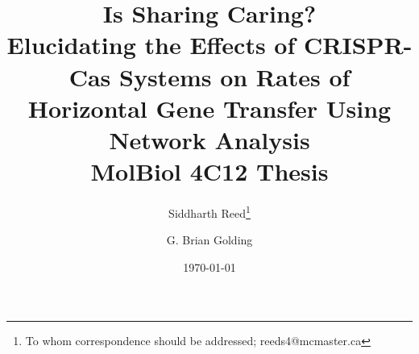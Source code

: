 \documentclass[12pt,letter]{article}
\begin{document}
\title{{\fontsize{30}{50}\selectfont Is Sharing Caring?}\\\vspace{0.4cm}
    Elucidating the Effects of CRISPR-Cas Systems on Rates of Horizontal Gene Transfer Using Network Analysis\\
       \Large MolBiol 4C12 Thesis}
\author[1]{Siddharth Reed\thanks{To whom correspondence should be addressed; reeds4@mcmaster.ca}}
\author[1]{G. Brian Golding\vspace{-0.45cm}}
\date{\today}
\maketitle

\newpage
\tableofcontents
\newpage
\linespread{1.25}%











\printbibliography
\end{document}
